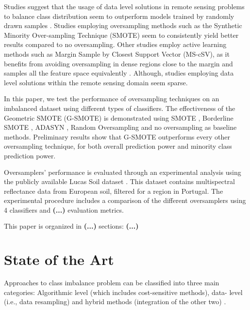 \documentclass[parskip=full]{scrartcl}
\begin{document}
Studies suggest that the usage of data level solutions in remote sensing
problems to balance class distribution seem to outperform models
trained by randomly drawn samples \cite{Wang2019, Mellor2015}.  Studies
employing oversampling methods such as the Synthetic Minority Over-sampling
Technique (SMOTE) \cite{Chawla2002} seem to consistently yield better results
\cite{Johnson2013, Geib2015} compared to no oversampling. Other studies employ
active learning methods such as Margin Sample by Closest Support Vector
(MS-cSV), as it benefits from avoiding oversampling in dense regions close to
the margin and samples all the feature space equivalently \cite{Tuia2009}.
Although, studies employing data level solutions within the remote sensing
domain seem sparse.

In this paper, we test the performance of oversampling techniques on an
imbalanced dataset using different types of classifiers. The effectiveness of
the Geometric SMOTE (G-SMOTE) \cite{Douzas2019} is demonstrated using SMOTE
\cite{Chawla2002}, Borderline SMOTE \cite{Han2005}, ADASYN \cite{HaiboHe2008},
Random Oversampling and no oversampling as baseline methods. Preliminary results
show that G-SMOTE outperforms every other oversampling technique, for both
overall prediction power and minority class prediction power.

Oversamplers' performance is evaluated through an experimental analysis using
the publicly available Lucas Soil dataset \cite{Toth2013}. This dataset contains
multispectral reflectance data from European soil, filtered for a region in
Portugal. The experimental procedure includes a comparison of the different
oversamplers using 4 classifiers and \textbf{(...)} evaluation metrics.

This paper is organized in \textbf{(...)} sections: \textbf{(...)}

\section{State of the Art}

Approaches to class imbalance problem can be classified into three main
categories: Algorithmic level (which includes cost-sensitive methods), data-
level (i.e., data resampling) and hybrid methods (integration of the other two)
\cite{Ji2018}.
\end{document}
